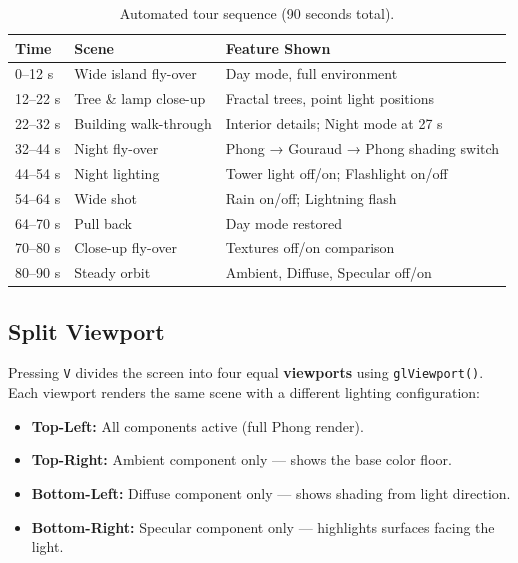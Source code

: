 \documentclass[12pt,a4paper]{article}
\begin{document}
\begin{table}[h!]
\centering
\begin{tabular}{@{} l l l @{}}
\toprule
\textbf{Time} & \textbf{Scene} & \textbf{Feature Shown} \\
\midrule
0--12 s  & Wide island fly-over    & Day mode, full environment \\
12--22 s & Tree \& lamp close-up  & Fractal trees, point light positions \\
22--32 s & Building walk-through  & Interior details; Night mode at 27 s \\
32--44 s & Night fly-over         & Phong → Gouraud → Phong shading switch \\
44--54 s & Night lighting         & Tower light off/on; Flashlight on/off \\
54--64 s & Wide shot              & Rain on/off; Lightning flash \\
64--70 s & Pull back              & Day mode restored \\
70--80 s & Close-up fly-over      & Textures off/on comparison \\
80--90 s & Steady orbit           & Ambient, Diffuse, Specular off/on \\
\bottomrule
\end{tabular}
\caption{Automated tour sequence (90 seconds total).}
\end{table}

\subsection{Split Viewport}

Pressing \texttt{V} divides the screen into four equal \textbf{viewports} using \texttt{glViewport()}. Each viewport renders the same scene with a different lighting configuration:
\begin{itemize}[noitemsep]
    \item \textbf{Top-Left:} All components active (full Phong render).
    \item \textbf{Top-Right:} Ambient component only --- shows the base color floor.
    \item \textbf{Bottom-Left:} Diffuse component only --- shows shading from light direction.
    \item \textbf{Bottom-Right:} Specular component only --- highlights surfaces facing the light.
\end{itemize}

\newpage
\end{document}

